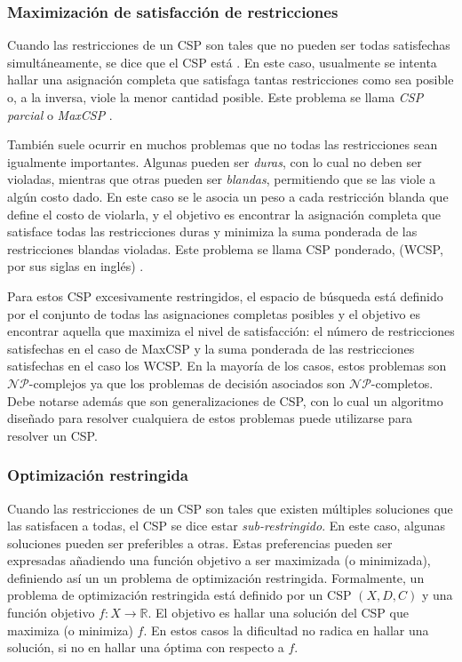 \documentclass{llncs}
\begin{document}
   	\subsubsection{Maximización de satisfacción de restricciones}
   	Cuando las restricciones de un CSP son tales que no pueden ser todas satisfechas simultáneamente, se dice que el CSP está . En este caso,
   	usualmente se intenta hallar una asignación completa que satisfaga tantas restricciones como sea posible o, a la inversa, viole la menor cantidad posible. Este problema se llama \textit{CSP parcial} o \textit{MaxCSP} \cite{fre:wal}.

	También suele ocurrir en muchos problemas que no todas las restricciones sean igualmente
	importantes. Algunas pueden ser \textit{duras}, con lo cual no deben ser violadas, mientras
	que otras pueden ser \textit{blandas}, permitiendo que se las viole a algún costo dado. En este caso se le asocia un peso a cada restricción blanda que define el costo de violarla, y el objetivo es encontrar la asignación completa que satisface todas las restricciones duras y minimiza la suma ponderada de las restricciones blandas violadas. Este problema se llama CSP ponderado, (WCSP, por sus siglas en inglés) \cite{shi:far:ver}.
	
	Para estos CSP excesivamente restringidos, el espacio de búsqueda está definido por el
	conjunto de todas las asignaciones completas posibles y el objetivo es encontrar aquella que maximiza el nivel de satisfacción: el número de restricciones satisfechas en el caso de MaxCSP y
	la suma ponderada de las restricciones satisfechas en el caso los WCSP. En la mayoría de los
	casos, estos problemas son $\mathcal{NP}$-complejos ya que los problemas de decisión asociados son $\mathcal{NP}$-completos. Debe notarse además que son generalizaciones de
	CSP, con lo cual un algoritmo diseñado para resolver cualquiera de estos problemas puede
	utilizarse para resolver un CSP.
	
	\subsubsection{Optimización restringida}
	Cuando las restricciones de un CSP son tales que existen múltiples soluciones que las satisfacen a todas, el CSP se dice estar \textit{sub-restringido}. En este caso, algunas soluciones
	pueden ser preferibles a otras. Estas preferencias pueden ser expresadas añadiendo una función
	objetivo a ser maximizada (o minimizada), definiendo así un un problema de optimización
	restringida. Formalmente, un problema de optimización restringida está definido por un CSP
	$(X, D, C)$ y una función objetivo $f: X \rightarrow \mathbb{R}$. El objetivo es hallar una solución del CSP que maximiza (o minimiza) $f$. En estos casos la dificultad no radica en hallar
	una solución, si no en hallar una óptima con respecto a $f$.
	
\end{document}
